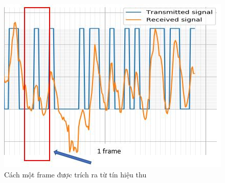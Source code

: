\begin{figure} [ht]
	\centering
	\captionsetup{justification=centering}
	\includegraphics [scale=0.8] {Image/Framing}
	\caption{Cách một frame được trích ra từ tín hiệu thu}
\end{figure}

